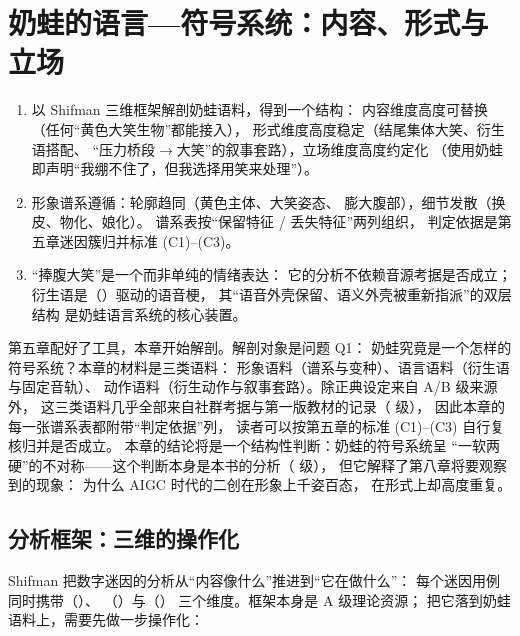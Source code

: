 \chapter{奶蛙的语言—符号系统：内容、形式与立场}\label{ch:06}

\begin{nlkeypoints}
  \begin{enumerate}[label=(\arabic*),leftmargin=2.4em]
    \item 以 Shifman 三维框架解剖奶蛙语料，得到一个结构：
          内容维度高度可替换（任何“黄色大笑生物”都能接入），
          形式维度高度稳定（结尾集体大笑、衍生语搭配、
          “压力桥段$\to$大笑”的叙事套路），立场维度高度约定化
          （使用奶蛙即声明“我绷不住了，但我选择用笑来处理”）。
    \item 形象谱系遵循：轮廓趋同（黄色主体、大笑姿态、
          膨大腹部），细节发散（换皮、物化、娘化）。
          谱系表按“保留特征 / 丢失特征”两列组织，
          判定依据是第五章迷因簇归并标准 (C1)--(C3)。
    \item “捧腹大笑”是一个而非单纯的情绪表达：
          它的分析不依赖音源考据是否成立；
          衍生语是（）驱动的语音梗，
          其“语音外壳保留、语义外壳被重新指派”的双层结构
          是奶蛙语言系统的核心装置。
  \end{enumerate}
\end{nlkeypoints}

第五章配好了工具，本章开始解剖。解剖对象是问题 Q1：
奶蛙究竟是一个怎样的符号系统？本章的材料是三类语料：
形象语料（谱系与变种）、语言语料（衍生语与固定音轨）、
动作语料（衍生动作与叙事套路）。除正典设定来自 A/B 级来源外，
这三类语料几乎全部来自社群考据与第一版教材的记录（ 级），
因此本章的每一张谱系表都附带“判定依据”列，
读者可以按第五章的标准 (C1)--(C3) 自行复核归并是否成立。
本章的结论将是一个结构性判断：奶蛙的符号系统呈
“一软两硬”的不对称——这个判断本身是本书的分析（ 级），
但它解释了第八章将要观察到的现象：
为什么 AIGC 时代的二创在形象上千姿百态，
在形式上却高度重复。

\section{分析框架：三维的操作化}\label{sec:06:framework}

Shifman 把数字迷因的分析从“内容像什么”推进到“它在做什么”：
每个迷因用例同时携带（）、
（）与（）
三个维度\cite{shifman2013memes}。框架本身是 A 级理论资源；
把它落到奶蛙语料上，需要先做一步操作化：

